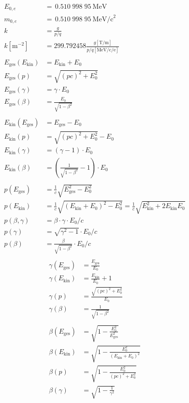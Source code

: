 \documentclass[12pt]{scrreprt}%
\begin{document}



 
\begin{align*}
E_{0,e}&=\,0.510\;998\;95~\text{MeV}\\
m_{0,e}&=\,0.510\;998\;95~\text{MeV/c}^2\\
k&=\frac{g}{p/q}\\
k[\text{m}^{-2}]&=299.792458\frac{g[\text{T/m}]}{p/q[\text{MeV/c/e}]}\\
\\
E_{\text{ges}}(E_{\text{kin}})&=E_{\text{kin}}+E_0\\
E_{\text{ges}}(p)&=\sqrt{(pc)^2+E_0^2}\\
E_{\text{ges}}(\gamma)&=\gamma\cdot E_0\\
E_{\text{ges}}(\beta)&=\frac{E_0}{\sqrt{1-\beta^2}}\\
\\
E_{\text{kin}}(E_{\text{ges}})&=E_{\text{ges}}-E_0\\
E_{\text{kin}}(p)&=\sqrt{(pc)^2+E_0^2}-E_0\\
E_{\text{kin}}(\gamma)&=(\gamma-1)\cdot E_0\\
E_{\text{kin}}(\beta)&=\left(\frac{1}{\sqrt{1-\beta^2}}-1\right)\cdot E_0\\
\\
p(E_{\text{ges}})&=\frac{1}{c}\sqrt{E_{\text{ges}}^2-E_0^2}\\
p(E_{\text{kin}})&=\frac{1}{c}\sqrt{\left(E_{\text{kin}}+E_0\right)^2-E_0^2}=\frac{1}{c}\sqrt{E_{\text{kin}}^2+2E_{\text{kin}}E_0}\\
p(\beta,\gamma)&=\beta\cdot \gamma\cdot E_0/c\\
p(\gamma)&=\sqrt{\gamma^2-1} \cdot E_0/c\\
p(\beta)&=\frac{\beta}{\sqrt{1-\beta^2}} \cdot E_0/c\\
\end{align*}
\begin{align*}
\gamma(E_{\text{ges}})&=\frac{E_{\text{ges}}}{E_0}\\
\gamma(E_{\text{kin}})&=\frac{E_{\text{kin}}}{E_0}+1\\
\gamma(p)&=\frac{\sqrt{(pc)^2+E_0^2}}{E_0}\\
\gamma(\beta)&=\frac{1}{\sqrt{1-\beta^2}}\\
\\
\beta(E_{\text{ges}})&=\sqrt{1-\frac{E_0^2}{E_{\text{ges}}^2}}\\
\beta(E_{\text{kin}})&=\sqrt{1-\frac{E_0^2}{\left(E_{\text{kin}}+E_0\right)^2}}\\
\beta(p)&=\sqrt{1-\frac{E_0^2}{(pc)^2+E_0^2}}\\
\beta(\gamma)&=\sqrt{1-\frac{1}{\gamma^2}}\\
\end{align*}
\end{document}
